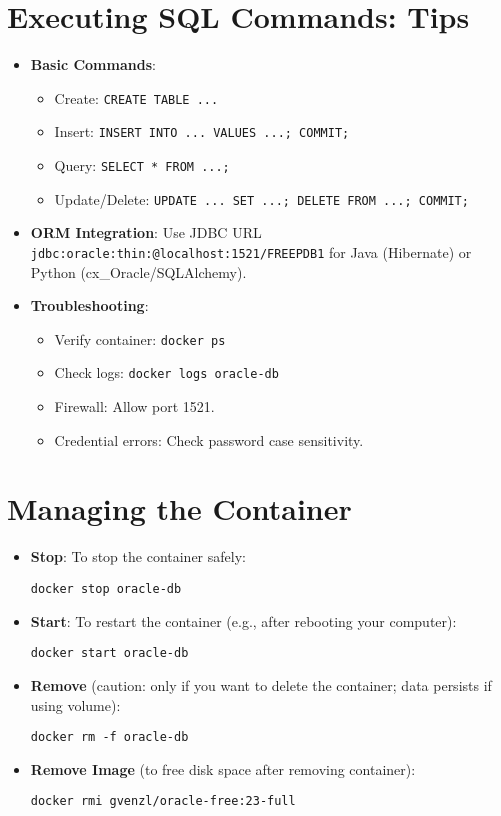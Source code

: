 \documentclass[a4paper,12pt]{article}
\begin{document}
\section{Executing SQL Commands: Tips}
\begin{itemize}
  \item \textbf{Basic Commands}:
    \begin{itemize}
      \item Create: \texttt{CREATE TABLE ...}
      \item Insert: \texttt{INSERT INTO ... VALUES ...; COMMIT;}
      \item Query: \texttt{SELECT * FROM ...;}
      \item Update/Delete: \texttt{UPDATE ... SET ...; DELETE FROM ...; COMMIT;}
    \end{itemize}
  \item \textbf{ORM Integration}: Use JDBC URL \texttt{jdbc:oracle:thin:@localhost:1521/FREEPDB1} for Java (Hibernate) or Python (cx\_Oracle/SQLAlchemy).
  \item \textbf{Troubleshooting}:
    \begin{itemize}
      \item Verify container: \texttt{docker ps}
      \item Check logs: \texttt{docker logs oracle-db}
      \item Firewall: Allow port 1521.
      \item Credential errors: Check password case sensitivity.
    \end{itemize}
\end{itemize}

\section{Managing the Container}
\begin{itemize}
  \item \textbf{Stop}: To stop the container safely:
    \begin{lstlisting}
docker stop oracle-db
    \end{lstlisting}
  \item \textbf{Start}: To restart the container (e.g., after rebooting your computer):
    \begin{lstlisting}
docker start oracle-db
    \end{lstlisting}
  \item \textbf{Remove} (caution: only if you want to delete the container; data persists if using volume):
    \begin{lstlisting}
docker rm -f oracle-db
    \end{lstlisting}
  \item \textbf{Remove Image} (to free disk space after removing container):
    \begin{lstlisting}
docker rmi gvenzl/oracle-free:23-full
    \end{lstlisting}
\end{itemize}
\end{document}
